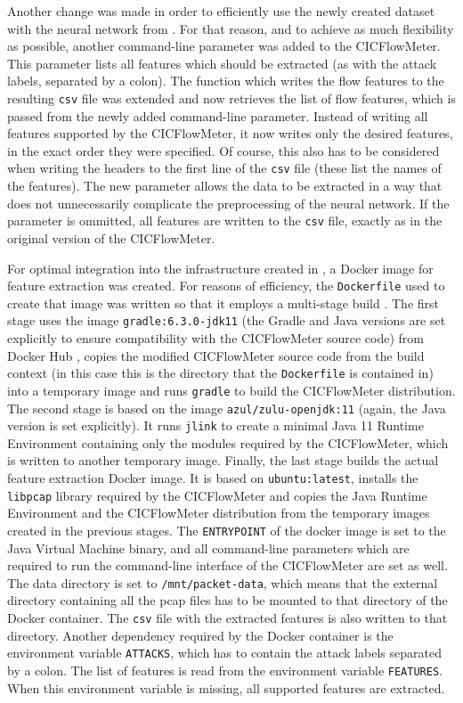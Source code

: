 \documentclass[conference]{IEEEtran}
\begin{document}
Another change was made in order to efficiently use the newly created dataset with the neural network from \cite{max1}. For that reason, and to achieve as much flexibility as possible, another command-line parameter was added to the CICFlowMeter. This parameter lists all features which should be extracted (as with the attack labels, separated by a colon). The function which writes the flow features to the resulting \verb|csv| file was extended and now retrieves the list of flow features, which is passed from the newly added command-line parameter. Instead of writing all features supported by the CICFlowMeter, it now writes only the desired features, in the exact order they were specified. Of course, this also has to be considered when writing the headers to the first line of the \verb|csv| file (these list the names of the features). The new parameter allows the data to be extracted in a way that does not unnecessarily complicate the preprocessing of the neural network. If the parameter is ommitted, all features are written to the \verb|csv| file, exactly as in the original version of the CICFlowMeter.

For optimal integration into the infrastructure created in \cite{paper1}, a Docker image for feature extraction was created. For reasons of efficiency, the \verb|Dockerfile| used to create that image was written so that it employs a multi-stage build \cite{docker-multistage}. The first stage uses the image \verb|gradle:6.3.0-jdk11| (the Gradle and Java versions are set explicitly to ensure compatibility with the CICFlowMeter source code) from Docker Hub \cite{dockerhub}, copies the modified CICFlowMeter source code from the build context (in this case this is the directory that the \verb|Dockerfile| is contained in) into a temporary image and runs \verb|gradle| to build the CICFlowMeter distribution. The second stage is based on the image \verb|azul/zulu-openjdk:11| (again, the Java version is set explicitly). It runs \verb|jlink| \cite{jlink} to create a minimal Java 11 Runtime Environment containing only the modules required by the CICFlowMeter, which is written to another temporary image. Finally, the last stage builds the actual feature extraction Docker image. It is based on \verb|ubuntu:latest|, installs the \verb|libpcap| library required by the CICFlowMeter and copies the Java Runtime Environment and the CICFlowMeter distribution from the temporary images created in the previous stages. The \verb|ENTRYPOINT| of the docker image is set to the Java Virtual Machine binary, and all command-line parameters which are required to run the command-line interface of the CICFlowMeter are set as well. The data directory is set to \verb|/mnt/packet-data|, which means that the external directory containing all the pcap files has to be mounted to that directory of the Docker container. The \verb|csv| file with the extracted features is also written to that directory. Another dependency required by the Docker container is the environment variable \verb|ATTACKS|, which has to contain the attack labels separated by a colon. The list of features is read from the environment variable \verb|FEATURES|. When this environment variable is missing, all supported features are extracted.
\end{document}

